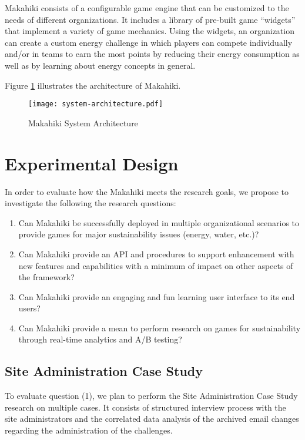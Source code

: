 \documentclass[11pt]{article}
\begin{document}
Makahiki consists of a configurable game engine that can be customized to the needs of
different organizations.  It includes a library of pre-built game ``widgets'' that
implement a variety of game mechanics.  Using the widgets, an organization can create a
custom energy challenge in which players can compete individually and/or in teams to earn
the most points by reducing their energy consumption as well as by learning about energy
concepts in general.

Figure \ref{fig:system-architecture} illustrates
the architecture of Makahiki.

\begin{figure}[htbp] %
   \centering
   \texttt{[image: system-architecture.pdf]} 
   \caption{Makahiki System Architecture}
   \label{fig:system-architecture}
\end{figure}


\section{Experimental Design}

In order to evaluate how the Makahiki meets the research goals, we propose to investigate the following the research questions:

\begin{enumerate}

\em \item Can Makahiki be successfully deployed in multiple organizational scenarios to provide games for major sustainability issues (energy, water, etc.)? \em
\em \item Can Makahiki provide an API and procedures to support enhancement with new features and capabilities with a minimum of impact on other aspects of the framework? \em
\em \item Can Makahiki provide an engaging and fun learning user interface to its end users? \em
\em \item Can Makahiki provide a mean to perform research on games for sustainability through real-time analytics and A/B testing? \em

\end{enumerate}

\subsection{Site Administration Case Study}
To evaluate question (1), we plan to perform the Site Administration Case Study research on multiple cases. It consists of structured interview process with the site administrators and the correlated data analysis of the archived email changes regarding the administration of the challenges.
\end{document}
